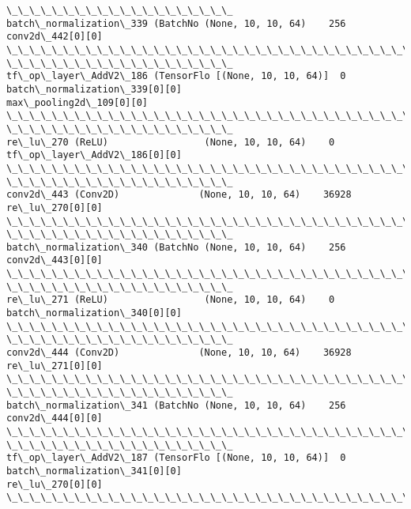 \documentclass[11pt]{article}
\begin{document}
\begin{Verbatim}[commandchars=\\\{\}]
\_\_\_\_\_\_\_\_\_\_\_\_\_\_\_\_\_\_\_\_
batch\_normalization\_339 (BatchNo (None, 10, 10, 64)    256
conv2d\_442[0][0]
\_\_\_\_\_\_\_\_\_\_\_\_\_\_\_\_\_\_\_\_\_\_\_\_\_\_\_\_\_\_\_\_\_\_\_\_\_\_\_\_\_\_\_\_\_\_\_\_\_\_\_\_\_\_\_\_\_\_\_\_\_\_\_\_\_\_\_\_\_\_\_\_\_\_\_\_\_\_\_\_
\_\_\_\_\_\_\_\_\_\_\_\_\_\_\_\_\_\_\_\_
tf\_op\_layer\_AddV2\_186 (TensorFlo [(None, 10, 10, 64)]  0
batch\_normalization\_339[0][0]
max\_pooling2d\_109[0][0]
\_\_\_\_\_\_\_\_\_\_\_\_\_\_\_\_\_\_\_\_\_\_\_\_\_\_\_\_\_\_\_\_\_\_\_\_\_\_\_\_\_\_\_\_\_\_\_\_\_\_\_\_\_\_\_\_\_\_\_\_\_\_\_\_\_\_\_\_\_\_\_\_\_\_\_\_\_\_\_\_
\_\_\_\_\_\_\_\_\_\_\_\_\_\_\_\_\_\_\_\_
re\_lu\_270 (ReLU)                 (None, 10, 10, 64)    0
tf\_op\_layer\_AddV2\_186[0][0]
\_\_\_\_\_\_\_\_\_\_\_\_\_\_\_\_\_\_\_\_\_\_\_\_\_\_\_\_\_\_\_\_\_\_\_\_\_\_\_\_\_\_\_\_\_\_\_\_\_\_\_\_\_\_\_\_\_\_\_\_\_\_\_\_\_\_\_\_\_\_\_\_\_\_\_\_\_\_\_\_
\_\_\_\_\_\_\_\_\_\_\_\_\_\_\_\_\_\_\_\_
conv2d\_443 (Conv2D)              (None, 10, 10, 64)    36928
re\_lu\_270[0][0]
\_\_\_\_\_\_\_\_\_\_\_\_\_\_\_\_\_\_\_\_\_\_\_\_\_\_\_\_\_\_\_\_\_\_\_\_\_\_\_\_\_\_\_\_\_\_\_\_\_\_\_\_\_\_\_\_\_\_\_\_\_\_\_\_\_\_\_\_\_\_\_\_\_\_\_\_\_\_\_\_
\_\_\_\_\_\_\_\_\_\_\_\_\_\_\_\_\_\_\_\_
batch\_normalization\_340 (BatchNo (None, 10, 10, 64)    256
conv2d\_443[0][0]
\_\_\_\_\_\_\_\_\_\_\_\_\_\_\_\_\_\_\_\_\_\_\_\_\_\_\_\_\_\_\_\_\_\_\_\_\_\_\_\_\_\_\_\_\_\_\_\_\_\_\_\_\_\_\_\_\_\_\_\_\_\_\_\_\_\_\_\_\_\_\_\_\_\_\_\_\_\_\_\_
\_\_\_\_\_\_\_\_\_\_\_\_\_\_\_\_\_\_\_\_
re\_lu\_271 (ReLU)                 (None, 10, 10, 64)    0
batch\_normalization\_340[0][0]
\_\_\_\_\_\_\_\_\_\_\_\_\_\_\_\_\_\_\_\_\_\_\_\_\_\_\_\_\_\_\_\_\_\_\_\_\_\_\_\_\_\_\_\_\_\_\_\_\_\_\_\_\_\_\_\_\_\_\_\_\_\_\_\_\_\_\_\_\_\_\_\_\_\_\_\_\_\_\_\_
\_\_\_\_\_\_\_\_\_\_\_\_\_\_\_\_\_\_\_\_
conv2d\_444 (Conv2D)              (None, 10, 10, 64)    36928
re\_lu\_271[0][0]
\_\_\_\_\_\_\_\_\_\_\_\_\_\_\_\_\_\_\_\_\_\_\_\_\_\_\_\_\_\_\_\_\_\_\_\_\_\_\_\_\_\_\_\_\_\_\_\_\_\_\_\_\_\_\_\_\_\_\_\_\_\_\_\_\_\_\_\_\_\_\_\_\_\_\_\_\_\_\_\_
\_\_\_\_\_\_\_\_\_\_\_\_\_\_\_\_\_\_\_\_
batch\_normalization\_341 (BatchNo (None, 10, 10, 64)    256
conv2d\_444[0][0]
\_\_\_\_\_\_\_\_\_\_\_\_\_\_\_\_\_\_\_\_\_\_\_\_\_\_\_\_\_\_\_\_\_\_\_\_\_\_\_\_\_\_\_\_\_\_\_\_\_\_\_\_\_\_\_\_\_\_\_\_\_\_\_\_\_\_\_\_\_\_\_\_\_\_\_\_\_\_\_\_
\_\_\_\_\_\_\_\_\_\_\_\_\_\_\_\_\_\_\_\_
tf\_op\_layer\_AddV2\_187 (TensorFlo [(None, 10, 10, 64)]  0
batch\_normalization\_341[0][0]
re\_lu\_270[0][0]
\_\_\_\_\_\_\_\_\_\_\_\_\_\_\_\_\_\_\_\_\_\_\_\_\_\_\_\_\_\_\_\_\_\_\_\_\_\_\_\_\_\_\_\_\_\_\_\_\_\_\_\_\_\_\_\_\_\_\_\_\_\_\_\_\_\_\_\_\_\_\_\_\_\_\_\_\_\_\_\_

\end{Verbatim}
\end{document}
